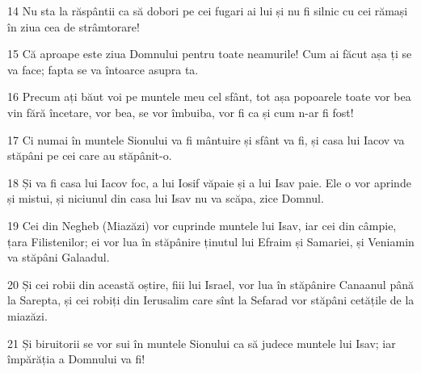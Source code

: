 \par 14 Nu sta la răspântii ca să dobori pe cei fugari ai lui și nu fi silnic cu cei rămași în ziua cea de strâmtorare!
\par 15 Că aproape este ziua Domnului pentru toate neamurile! Cum ai făcut așa ți se va face; fapta se va întoarce asupra ta.
\par 16 Precum ați băut voi pe muntele meu cel sfânt, tot așa popoarele toate vor bea vin fără încetare, vor bea, se vor îmbuiba, vor fi ca și cum n-ar fi fost!
\par 17 Ci numai în muntele Sionului va fi mântuire și sfânt va fi, și casa lui Iacov va stăpâni pe cei care au stăpânit-o.
\par 18 Și va fi casa lui Iacov foc, a lui Iosif văpaie și a lui Isav paie. Ele o vor aprinde și mistui, și niciunul din casa lui Isav nu va scăpa, zice Domnul.
\par 19 Cei din Negheb (Miazăzi) vor cuprinde muntele lui Isav, iar cei din câmpie, țara Filistenilor; ei vor lua în stăpânire ținutul lui Efraim și Samariei, și Veniamin va stăpâni Galaadul.
\par 20 Și cei robii din această oștire, fiii lui Israel, vor lua în stăpânire Canaanul până la Sarepta, și cei robiți din Ierusalim care sînt la Sefarad vor stăpâni cetățile de la miazăzi.
\par 21 Și biruitorii se vor sui în muntele Sionului ca să judece muntele lui Isav; iar împărăția a Domnului va fi!


